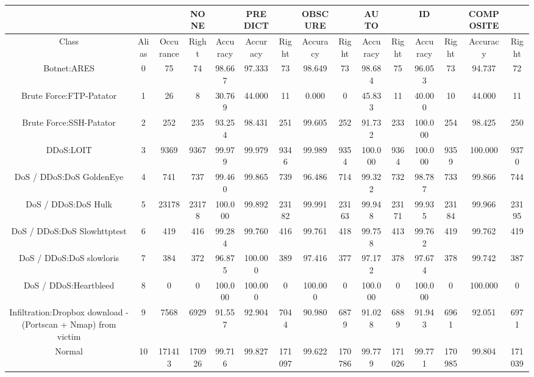 \begin{table}[htb]
    \centering
    \begin{tabular}{@{}ccccccccccccccc@{}}
        \toprule
         &  &  & NONE &  & PREDICT &  & OBSCURE &  & AUTO &  & ID &  & COMPOSITE &  \\
        \midrule
        Class &  Alias &  Occurance &  Right &  Accuracy &  Accuracy &  Right &  Accuracy &  Right &  Accuracy &  Right &  Accuracy &  Right &  Accuracy &  Right \\
        Botnet:ARES &  0 &  75 &  74 &  98.667 &  97.333 &  73 &  98.649 &  73 &  98.684 &  75 &  96.053 &  73 &  94.737 &  72 \\
        Brute Force:FTP-Patator &  1 &  26 &  8 &  30.769 &  44.000 &  11 &  0.000 &  0 &  45.833 &  11 &  40.000 &  10 &  44.000 &  11 \\
        Brute Force:SSH-Patator &  2 &  252 &  235 &  93.254 &  98.431 &  251 &  99.605 &  252 &  91.732 &  233 &  100.000 &  254 &  98.425 &  250 \\
        DDoS:LOIT &  3 &  9369 &  9367 &  99.979 &  99.979 &  9346 &  99.989 &  9354 &  100.000 &  9364 &  100.000 &  9359 &  100.000 &  9370 \\
        DoS / DDoS:DoS GoldenEye &  4 &  741 &  737 &  99.460 &  99.865 &  739 &  96.486 &  714 &  99.322 &  732 &  98.787 &  733 &  99.866 &  744 \\
        DoS / DDoS:DoS Hulk &  5 &  23178 &  23178 &  100.000 &  99.892 &  23182 &  99.991 &  23163 &  99.948 &  23171 &  99.935 &  23184 &  99.966 &  23195 \\
        DoS / DDoS:DoS Slowhttptest &  6 &  419 &  416 &  99.284 &  99.760 &  416 &  99.761 &  418 &  99.758 &  413 &  99.762 &  419 &  99.762 &  419 \\
        DoS / DDoS:DoS slowloris &  7 &  384 &  372 &  96.875 &  100.000 &  389 &  97.416 &  377 &  97.172 &  378 &  97.674 &  378 &  99.742 &  387 \\
        DoS / DDoS:Heartbleed &  8 &  0 &  0 &  100.000 &  100.000 &  0 &  100.000 &  0 &  100.000 &  0 &  100.000 &  0 &  100.000 &  0 \\
        Infiltration:Dropbox download - (Portscan + Nmap) from victim &  9 &  7568 &  6929 &  91.557 &  92.904 &  7044 &  90.980 &  6879 &  91.028 &  6889 &  91.943 &  6961 &  92.051 &  6971 \\
        Normal &  10 &  171413 &  170926 &  99.716 &  99.827 &  171097 &  99.622 &  170786 &  99.779 &  171026 &  99.771 &  170985 &  99.804 &  171039 \\

\end{tabular}
\end{table}
